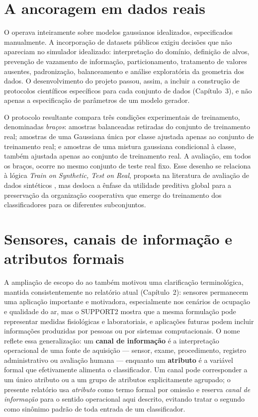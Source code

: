 \section{A ancoragem em dados reais}

O \SLACGS{} operava inteiramente sobre modelos gaussianos idealizados, especificados manualmente. A incorporação de datasets públicos exigiu decisões que não apareciam no simulador idealizado: interpretação do domínio, definição de alvos, prevenção de vazamento de informação, particionamento, tratamento de valores ausentes, padronização, balanceamento e análise exploratória da geometria dos dados. O desenvolvimento do projeto passou, assim, a incluir a construção de protocolos científicos específicos para cada conjunto de dados (Capítulo~3), e não apenas a especificação de parâmetros de um modelo gerador.

O protocolo resultante compara três condições experimentais de treinamento, denominadas \emph{braços}: amostras balanceadas retiradas do conjunto de treinamento real; amostras de uma Gaussiana única por classe ajustada apenas ao conjunto de treinamento real; e amostras de uma mistura gaussiana condicional à classe, também ajustada apenas ao conjunto de treinamento real. A avaliação, em todos os braços, ocorre no mesmo conjunto de teste real fixo. Esse desenho se relaciona à lógica \emph{Train on Synthetic, Test on Real}, proposta na literatura de avaliação de dados sintéticos \cite{esteban2017}, mas desloca a ênfase da utilidade preditiva global para a preservação da organização cooperativa que emerge do treinamento dos classificadores para os diferentes subconjuntos.

\section{Sensores, canais de informação e atributos formais}

A ampliação de escopo do \SLACGS{} ao \CoInfoSim{} também motivou uma clarificação terminológica, mantida consistentemente no relatório atual (Capítulo~2): sensores permanecem uma aplicação importante e motivadora, especialmente nos cenários de ocupação e qualidade do ar, mas o SUPPORT2 mostra que a mesma formulação pode representar medidas fisiológicas e laboratoriais, e aplicações futuras podem incluir informações produzidas por pessoas ou por sistemas computacionais. O nome \CoInfoSim{} reflete essa generalização: um \textbf{canal de informação} é a interpretação operacional de uma fonte de aquisição --- sensor, exame, procedimento, registro administrativo ou avaliação humana --- enquanto um \textbf{atributo} é a variável formal que efetivamente alimenta o classificador. Um canal pode corresponder a um único atributo ou a um grupo de atributos explicitamente agrupado; o presente relatório usa \emph{atributo} como termo formal por omissão e reserva \emph{canal de informação} para o sentido operacional aqui descrito, evitando tratar o segundo como sinônimo padrão de toda entrada de um classificador.
